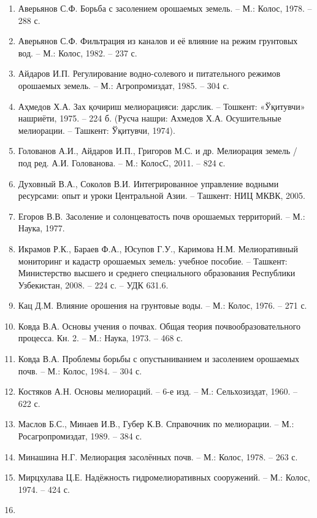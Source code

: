\begin{enumerate}
\def\labelenumi{\arabic{enumi}.}
\setcounter{enumi}{8}
\item
  Аверьянов С.Ф. Борьба с засолением орошаемых земель. -- М.: Колос,
  1978. -- 288 с.
\item
  Аверьянов С.Ф. Фильтрация из каналов и её влияние на режим грунтовых
  вод. -- М.: Колос, 1982. -- 237 с.
\item
  Айдаров И.П. Регулирование водно-солевого и питательного режимов
  орошаемых земель. -- М.: Агропромиздат, 1985. -- 304 с.
\item
  Аҳмедов Х.А. Зах қочириш мелиорацияси: дарслик. -- Тошкент: «Ўқитувчи»
  нашриёти, 1975. -- 224 б. (Русча нашри: Ахмедов Х.А. Осушительные
  мелиорации. -- Ташкент: Ўқитувчи, 1974).
\item
  Голованов А.И., Айдаров И.П., Григоров М.С. и др. Мелиорация земель /
  под ред. А.И. Голованова. -- М.: КолосС, 2011. -- 824 с.
\item
  Духовный В.А., Соколов В.И. Интегрированное управление водными
  ресурсами: опыт и уроки Центральной Азии. -- Ташкент: НИЦ МКВК, 2005.
\item
  Егоров В.В. Засоление и солонцеватость почв орошаемых территорий. --
  М.: Наука, 1977.
\item
  Икрамов Р.К., Бараев Ф.А., Юсупов Г.У., Каримова Н.М. Мелиоративный
  мониторинг и кадастр орошаемых земель: учебное пособие. -- Ташкент:
  Министерство высшего и среднего специального образования Республики
  Узбекистан, 2008. -- 224 с. -- УДК 631.6.
\item
  Кац Д.М. Влияние орошения на грунтовые воды. -- М.: Колос, 1976. --
  271 с.
\item
  Ковда В.А. Основы учения о почвах. Общая теория почвообразовательного
  процесса. Кн. 2. -- М.: Наука, 1973. -- 468 с.
\item
  Ковда В.А. Проблемы борьбы с опустыниванием и засолением орошаемых
  почв. -- М.: Колос, 1984. -- 304 с.
\item
  Костяков А.Н. Основы мелиораций. -- 6-е изд. -- М.: Сельхозиздат,
  1960. -- 622 с.
\item
  Маслов Б.С., Минаев И.В., Губер К.В. Справочник по мелиорации. -- М.:
  Росагропромиздат, 1989. -- 384 с.
\item
  Минашина Н.Г. Мелиорация засолённых почв. -- М.: Колос, 1978. -- 263
  с.
\item
  Мирцхулава Ц.Е. Надёжность гидромелиоративных сооружений. -- М.:
  Колос, 1974. -- 424 с.
\item

\end{enumerate}
